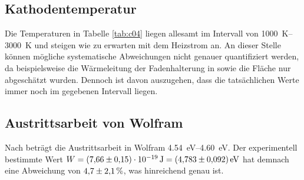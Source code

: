 

\subsection{Kathodentemperatur}
Die Temperaturen in Tabelle \ref{tab:c04} liegen allesamt im Intervall von \qtyrange[]{1000}{3000}{\kelvin} und steigen wie zu erwarten
mit dem Heizstrom an.
An dieser Stelle können mögliche systematische Abweichungen nicht genauer quantifiziert werden, da beispielsweise die Wärmeleitung der Fadenhalterung
in \cite[]{man:v504} sowie die Fläche nur abgeschätzt wurden.
Dennoch ist davon auszugehen, dass die tatsächlichen Werte immer noch im gegebenen Intervall liegen.


\subsection{Austrittsarbeit von Wolfram}
Nach \cite[]{austrittsarbeit} beträgt die Austrittsarbeit in Wolfram \qtyrange[]{4.54}{4.60}{\electronvolt}.
Der experimentell bestimmte Wert $W = \qty{7.66(15)e-19}{\joule} = \qty[]{4.783 +- 0.092}{\electronvolt}$ hat demnach eine 
Abweichung von $\num[]{4.7+-2.1} \, \%$, was hinreichend genau ist.
